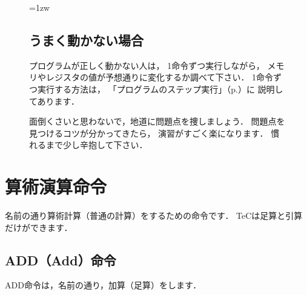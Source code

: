\begin{figure}[btp]
\begin{framed}{\parindent=1zw
\subsection*{うまく動かない場合}
プログラムが正しく動かない人は，
1命令ずつ実行しながら，
メモリやレジスタの値が予想通りに変化するか調べて下さい．
1命令ずつ実行する方法は，%
「プログラムのステップ実行」（p.\pageref{step}）に
説明してあります．

面倒くさいと思わないで，地道に問題点を捜しましょう．
問題点を見つけるコツが分かってきたら，
演習がすごく楽になります．
慣れるまで少し辛抱して下さい．
}\end{framed}
\end{figure}

\newpage
\section{算術演算命令}

名前の通り算術計算（普通の計算）をするための命令です．
TeCは足算と引算だけができます．

\subsection{ADD（Add）命令}
ADD命令は，名前の通り，加算（足算）をします．

